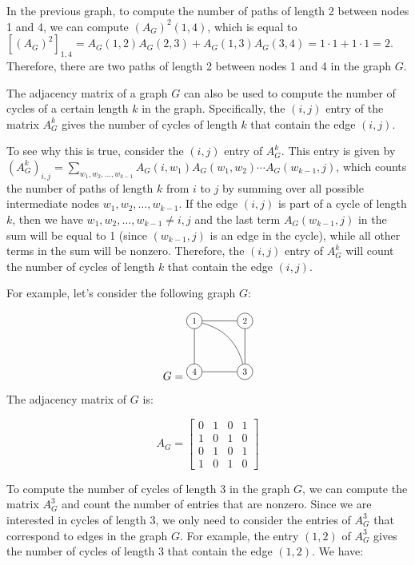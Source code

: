 In the previous graph, to compute the number of paths of length 2 between nodes 1 and 4, we can compute $(A_G)^2(1,4)$, which is equal to $[(A_G)^2]_{1,4} = A_G(1,2)A_G(2,3) + A_G(1,3)A_G(3,4) = 1 \cdot 1 + 1 \cdot 1 = 2$. Therefore, there are two paths of length 2 between nodes 1 and 4 in the graph $G$.

The adjacency matrix of a graph $G$ can also be used to compute the number of cycles of a certain length $k$ in the graph. Specifically, the $(i,j)$ entry of the matrix $A_G^k$ gives the number of cycles of length $k$ that contain the edge $(i,j)$.

To see why this is true, consider the $(i,j)$ entry of $A_G^k$. This entry is given by $(A_G^k)_{i,j} = \sum_{w_1, w_2, \ldots, w_{k-1}} A_G(i,w_1) A_G(w_1,w_2) \cdots A_G(w_{k-1},j)$, which counts the number of paths of length $k$ from $i$ to $j$ by summing over all possible intermediate nodes $w_1, w_2, \ldots, w_{k-1}$. If the edge $(i,j)$ is part of a cycle of length $k$, then we have $w_1, w_2, \ldots, w_{k-1} \neq i,j$ and the last term $A_G(w_{k-1},j)$ in the sum will be equal to 1 (since $(w_{k-1}, j)$ is an edge in the cycle), while all other terms in the sum will be nonzero. Therefore, the $(i,j)$ entry of $A_G^k$ will count the number of cycles of length $k$ that contain the edge $(i,j)$.

For example, let's consider the following graph $G$:

\[
G = \begin{tikzpicture}[scale=0.8, transform shape]
    \node[shape=circle,draw=black] (1) at (0,2) {1};
    \node[shape=circle,draw=black] (2) at (2,2) {2};
    \node[shape=circle,draw=black] (3) at (2,0) {3};
    \node[shape=circle,draw=black] (4) at (0,0) {4};
    \draw[-] (1) -- (2);
    \draw[-] (2) -- (3);
    \draw[-] (3) -- (4);
    \draw[-] (4) -- (1);
    \draw[-] (1) to [bend left=30] (3);
\end{tikzpicture}
\]

The adjacency matrix of $G$ is:

\[
A_G = \begin{bmatrix}
0 & 1 & 0 & 1 \\
1 & 0 & 1 & 0 \\
0 & 1 & 0 & 1 \\
1 & 0 & 1 & 0
\end{bmatrix}
\]

To compute the number of cycles of length 3 in the graph $G$, we can compute the matrix $A_G^3$ and count the number of entries that are nonzero. Since we are interested in cycles of length 3, we only need to consider the entries of $A_G^3$ that correspond to edges in the graph $G$. For example, the entry $(1,2)$ of $A_G^3$ gives the number of cycles of length 3 that contain the edge $(1,2)$. We have:

